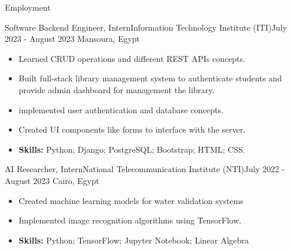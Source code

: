 \documentclass[]{cv}
\begin{document}
	\makeheader 



		

	\begin{cvsection}{Employment}
				\vspace{3mm}


				\begin{cvsubsection}{Software Backend Engineer, Intern}{Information Technology Institute (ITI)}{July 2023 - August 2023 \linebreak Mansoura, Egypt}
			\vspace{3mm}

			\begin{itemize}
				\item Learned CRUD operations and different REST APIs concepts.
				\item Built full-stack library management system to authenticate students and provide admin dashboard for management the library.
				\item implemented user authentication and database concepts.
				\item Created UI components like forms to interface with the server.
				\item \textbf{Skills:} Python; Django; PostgreSQL; Bootstrap; HTML; CSS.
			\end{itemize}
		\end{cvsubsection}		
		\begin{cvsubsection}{AI Researcher, Intern}{National Telecommunication Institute (NTI)}{July 2022 - August 2023 \linebreak Cairo, Egypt}
			\vspace{3mm}

			\begin{itemize}
				\item Created machine learning models for water validation systems
				\item Implemented image recognition algorithms using TensorFlow.
				\item \textbf{Skills:} Python; TensorFlow; Jupyter Notebook; Linear Algebra 
			\end{itemize}
		\end{cvsubsection}
		

		
	
		
	\end{cvsection}
	
\end{document}
